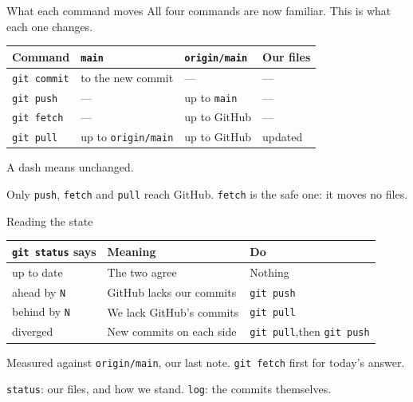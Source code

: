 \documentclass[aspectratio=169,11pt]{beamer}
\begin{document}
\begin{frame}[fragile]{What each command moves}
All four commands are now familiar. This is what each one changes.

\vspace{0.9em}
\begin{center}
\small
\begin{tabular}{@{}p{}p{}p{}p{}@{}}
\toprule
\textbf{Command} & \textbf{\texttt{main}} & \textbf{\texttt{origin/main}} & \textbf{Our files} \\
\midrule
\texttt{git commit} & to the new commit & --- & --- \\
\texttt{git push} & --- & up to \texttt{main} & --- \\
\texttt{git fetch} & --- & up to GitHub & --- \\
\texttt{git pull} & up to \texttt{origin/main} & up to GitHub & updated \\
\bottomrule
\end{tabular}
\end{center}

\vspace{0.9em}
A dash means unchanged.

\vspace{0.5em}
Only \texttt{push}, \texttt{fetch} and \texttt{pull} reach GitHub. \texttt{fetch}
is the safe one: it moves no files.
\end{frame}

\begin{frame}[fragile]{Reading the state}
\begin{center}
\small
\begin{tabular}{@{}p{}p{}p{}@{}}
\toprule
\textbf{\texttt{git status} says} & \textbf{Meaning} & \textbf{Do} \\
\midrule
up to date & The two agree & Nothing \\
ahead by \texttt{N} & GitHub lacks our commits & \texttt{git push} \\
behind by \texttt{N} & We lack GitHub's commits & \texttt{git pull} \\
diverged & New commits on each side & \texttt{git pull},\newline then \texttt{git push} \\
\bottomrule
\end{tabular}
\end{center}

\vspace{0.9em}
Measured against \texttt{origin/main}, our last note. \texttt{git fetch} first
for today's answer.

\vspace{0.5em}
\texttt{status}: our files, and how we stand. \texttt{log}: the commits
themselves.
\end{frame}
\end{document}
